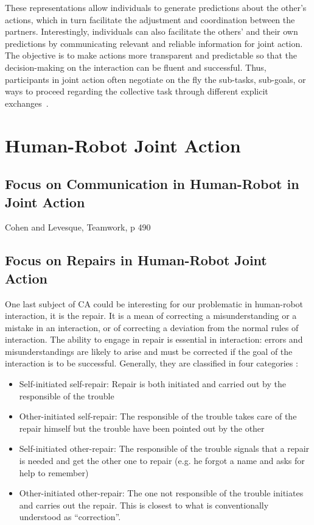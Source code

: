 \documentclass[a4paper,11pt,twoside]{StyleThese}
\begin{document}
These representations allow individuals to generate predictions about the other’s actions, which in turn facilitate the adjustment and coordination between the partners. Interestingly, individuals can also facilitate the others’ and their own predictions by communicating relevant and reliable information for joint action. The objective is to make actions more transparent and predictable so that the decision-making on the interaction can be fluent and successful. Thus, participants in joint action often negotiate on the fly the sub-tasks, sub-goals, or ways to proceed regarding the collective task through different explicit exchanges~\cite{clark_1996_using}.



\section{Human-Robot Joint Action}


\subsection{Focus on Communication in Human-Robot in Joint Action}

Cohen and Levesque, Teamwork, p 490

\subsection{Focus on Repairs in Human-Robot Joint Action}

One last subject of CA could be interesting for our problematic in human-robot interaction, it is the repair. It is a mean of correcting a misunderstanding or a mistake in an interaction, or of correcting a deviation from the normal rules of interaction. The ability to engage in repair is essential in interaction: errors and misunderstandings are likely to arise and must be corrected if the  goal of the interaction is to be successful. Generally, they are classified in four categories \cite{schegloff_1977_preference,wooffitt_2008_conversation}:
\begin{itemize}
	\item Self-initiated self-repair: Repair is both initiated and carried out by the responsible of the trouble
	\item Other-initiated self-repair: The responsible of the trouble takes care of the repair himself but the trouble have been pointed out by the other
	\item Self-initiated other-repair: The responsible of the trouble signals that a repair is needed and get the other one to repair (e.g. he forgot a name and asks for help to remember)
	\item Other-initiated other-repair: The one not responsible of the trouble initiates and carries out the repair. This is closest to what is conventionally understood as ``correction''.
\end{itemize}
\end{document}

